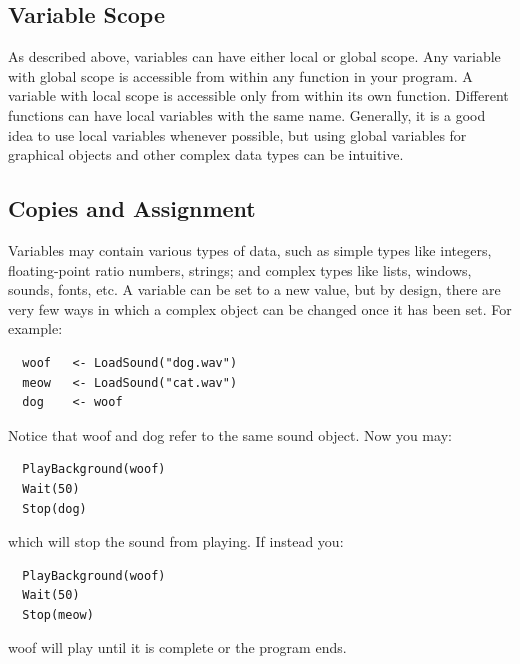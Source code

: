 \subsection{Variable Scope}

As described above, variables can have either local or  
global scope.  Any variable with global scope is accessible
from within any function in your program.  A variable with local
scope is accessible only from within its own function.  Different functions can have local variables with
the same name. Generally, it is a good idea  to use local
variables whenever possible, but using global variables for graphical
objects and other complex data types can be intuitive.

\subsection{Copies and Assignment}
\label{sec:copies_and_ass}

Variables may contain various types of data, such as simple types like integers, floating-point ratio numbers, strings; and complex types like lists, windows, sounds, fonts, etc. A variable can be set to a new value, but by design, there are very few ways in which a complex object can be changed once it has been set. For example:
\begin{verbatim}
  woof   <- LoadSound("dog.wav")
  meow   <- LoadSound("cat.wav")
  dog    <- woof
\end{verbatim}
Notice that woof and dog refer to the same sound object. Now you may:
\begin{verbatim}
  PlayBackground(woof)
  Wait(50)
  Stop(dog)
\end{verbatim}
which will stop the sound from playing. If instead you:
\begin{verbatim}
  PlayBackground(woof)
  Wait(50)
  Stop(meow)
\end{verbatim}
woof will play until it is complete or the program ends.


